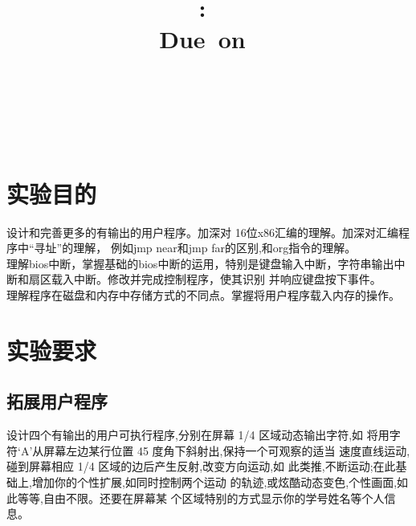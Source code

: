\documentclass[a4paper]{article}
\title{
\vspace{2in}
\textmd{\textbf{\hmwkClass:\ \hmwkTitle}}\\
\normalsize\vspace{0.1in}\small{Due\ on\ \hmwkDueDate}\\
\vspace{0.1in}\large{\textit{\hmwkClassInstructor\ \hmwkClassTime}}
\vspace{3in}
}
\author{\textbf{\LARGE{\hmwkAuthorName}} \\ \\ \textbf{\LARGE{\hmwkAuthorId}}}
\date{} %
\newcommand{\codev}[1]{\textsf{#1}}
\begin{document}

\maketitle


\setcounter{tocdepth}{2} %


\renewcommand{\cftsecleader}{\cftdotfill{\cftdotsep}} %
\renewcommand{\contentsname}{Content} %
\newpage
\tableofcontents
{}
\newpage



\section{实验目的}
设计和完善更多的有输出的用户程序。加深对 16位x86汇编的理解。加深对汇编程序中``寻址''的理解，
例如\codev{jmp near}和\codev{jmp far}的区别,和\codev{org}指令的理解。\\

理解bios中断，掌握基础的bios中断的运用，特别是键盘输入中断，字符串输出中断和扇区载入中断。修改并完成控制程序，使其识别
并响应键盘按下事件。\\

理解程序在磁盘和内存中存储方式的不同点。掌握将用户程序载入内存的操作。\\

\section{实验要求}
    \subsection{拓展用户程序}
    设计四个有输出的用户可执行程序,分别在屏幕 1/4 区域动态输出字符,如
    将用字符`A'从屏幕左边某行位置 45 度角下斜射出,保持一个可观察的适当
    速度直线运动,碰到屏幕相应 1/4 区域的边后产生反射,改变方向运动,如
    此类推,不断运动;在此基础上,增加你的个性扩展,如同时控制两个运动
    的轨迹,或炫酷动态变色,个性画面,如此等等,自由不限。还要在屏幕某
    个区域特别的方式显示你的学号姓名等个人信息。
\end{document}

